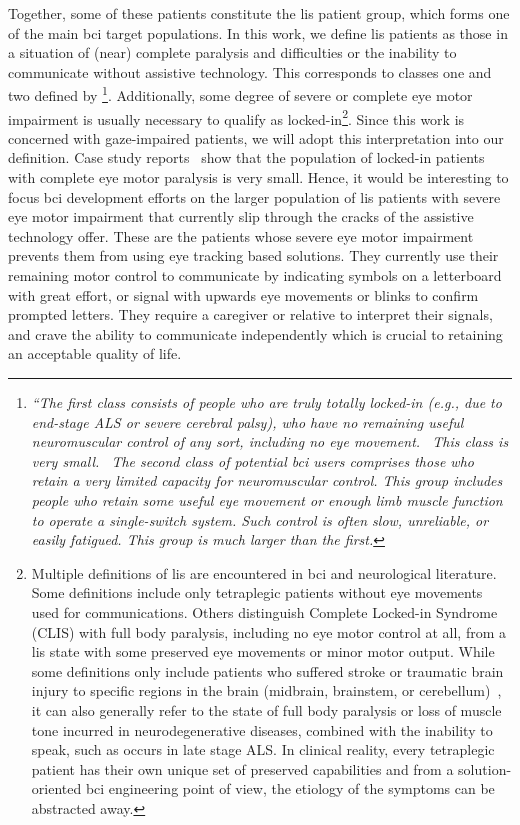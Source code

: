 \newcommand\fnlis{\footnote{
Multiple definitions of \ac{lis} are encountered in
\ac{bci} and neurological literature.
Some definitions include only tetraplegic patients without eye movements used
for communications.
Others distinguish Complete Locked-in Syndrome (CLIS) with full body paralysis,
including no eye motor control at all, from a \ac{lis} state with some preserved eye
movements or minor motor output.
While some definitions only include patients who suffered stroke or traumatic
brain injury to specific regions in the brain (midbrain, brainstem, or
cerebellum)~\cite{Smith2005},
it can also generally refer to the state of full body paralysis
or loss of muscle tone incurred in neurodegenerative diseases, combined with
the inability to speak, such as occurs in late stage ALS.
In clinical reality, every tetraplegic patient has their own unique set of
preserved capabilities and from a solution-oriented \ac{bci} engineering point
of view, the etiology of the symptoms can be abstracted away.
}}

\newcommand\fnwolpawcrit{\footnote{
\it``The first class consists of people who are truly totally locked-in (e.g.,
due to end-stage ALS or severe cerebral palsy), who have no remaining
useful neuromuscular control of any sort, including no eye movement.
\elide\ This class is very small. \elide\
The second class of potential \ac{bci} users comprises those who retain
a very limited capacity for neuromuscular control. This group includes
people who retain some useful eye movement or enough limb muscle
function to operate a single-switch system. Such control is often slow,
unreliable, or easily fatigued.
This group is much larger than the first.
}}


Together, some of these patients constitute the \ac{lis} patient group, which
forms one of the main \ac{bci} target populations.
In this work, we define \ac{lis} patients as those in a situation of (near)
complete paralysis and difficulties or the inability to communicate without
assistive technology.
This corresponds to classes one and two defined by
\textcite{Wolpaw2006}\fnwolpawcrit.
Additionally, some degree of severe or complete eye motor impairment is usually
necessary to qualify as locked-in\fnlis.
Since this work is concerned with gaze-impaired patients, we will adopt this
interpretation into our definition.
Case study reports~\cite{Patterson1986} show that the population of locked-in
patients with complete eye motor paralysis is very small.
Hence, it would be interesting to focus \ac{bci} development efforts on the
larger population of \ac{lis} patients with severe eye motor impairment that
currently slip through the cracks of the assistive technology offer.
These are the patients whose severe eye motor impairment prevents them from
using eye tracking based solutions.
They currently use their remaining motor control to
communicate by indicating symbols on a letterboard with great effort,
or signal with upwards eye movements or blinks to confirm prompted letters.
They require a caregiver or relative to interpret their signals, and crave
the ability to communicate independently which is crucial to retaining an
acceptable quality of life.

